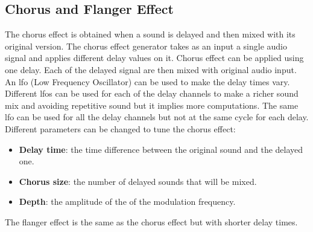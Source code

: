 \subsection{Chorus and Flanger Effect}

The chorus effect is obtained when a sound is delayed and then mixed with its original version. 
The chorus effect generator takes as an input a single audio signal and applies different delay values on it. Chorus effect can be applied using one delay. Each of the delayed signal are then mixed with original audio input. 
An \gls{lfo} (Low Frequency Oscillator) can be used to make the delay times vary. Different \gls{lfo}s can be used for each of the delay channels to make a richer sound mix and avoiding repetitive sound but it implies more computations. The same \gls{lfo} can be used for all the delay channels but not at the same cycle for each delay. \\

Different parameters can be changed to tune the chorus effect:\\
\begin{itemize}
\item \textbf{Delay time}: the time difference between the original sound and the delayed one.
\item \textbf{Chorus size}: the number of delayed sounds that will be mixed.
\item \textbf{Depth}: the amplitude of the of the modulation frequency.
\end{itemize}

The flanger effect is the same as the chorus effect but with shorter delay times. 

